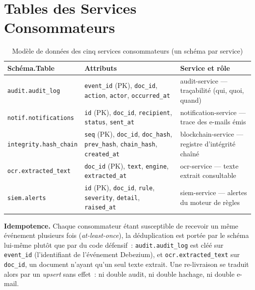 \documentclass[12pt,a4paper,openany]{report}
\begin{document}
    \section{Tables des Services Consommateurs}

    \begin{table}[H]
    \centering
    \small
    \begin{tabularx}{\textwidth}{p{3.3cm}Xp{3.2cm}}
    \toprule
    \textbf{Sch\'ema.Table} & \textbf{Attributs} & \textbf{Service et r\^ole} \\
    \midrule
    \texttt{audit.audit\_log} & \texttt{event\_id} (PK), \texttt{doc\_id}, \texttt{action}, \texttt{actor}, \texttt{occurred\_at} & audit-service --- tra\c{c}abilit\'e (qui, quoi, quand) \\[4pt]
    \texttt{notif.notifications} & \texttt{id} (PK), \texttt{doc\_id}, \texttt{recipient}, \texttt{status}, \texttt{sent\_at} & notification-service --- trace des e-mails \'emis \\[4pt]
    \texttt{integrity.hash\_chain} & \texttt{seq} (PK), \texttt{doc\_id}, \texttt{doc\_hash}, \texttt{prev\_hash}, \texttt{chain\_hash}, \texttt{created\_at} & blockchain-service --- registre d'int\'egrit\'e cha\^in\'e \\[4pt]
    \texttt{ocr.extracted\_text} & \texttt{doc\_id} (PK), \texttt{text}, \texttt{engine}, \texttt{extracted\_at} & ocr-service --- texte extrait consultable \\[4pt]
    \texttt{siem.alerts} & \texttt{id} (PK), \texttt{doc\_id}, \texttt{rule}, \texttt{severity}, \texttt{detail}, \texttt{raised\_at} & siem-service --- alertes du moteur de r\`egles \\
    \bottomrule
    \end{tabularx}
    \caption{Mod\`ele de donn\'ees des cinq services consommateurs (un sch\'ema par service)}
    \end{table}

    \begin{notebox}
    \textbf{Idempotence.} Chaque consommateur \'etant susceptible de recevoir un m\^eme \'ev\'enement plusieurs fois (\emph{at-least-once}), la d\'eduplication est port\'ee par le sch\'ema lui-m\^eme plut\^ot que par du code d\'efensif~: \texttt{audit.audit\_log} est cl\'e\'e sur \texttt{event\_id} (l'identifiant de l'\'ev\'enement Debezium), et \texttt{ocr.extracted\_text} sur \texttt{doc\_id}, un document n'ayant qu'un seul texte extrait. Une re-livraison se traduit alors par un \emph{upsert} sans effet~: ni double audit, ni double hachage, ni double e-mail.
    \end{notebox}
\end{document}
